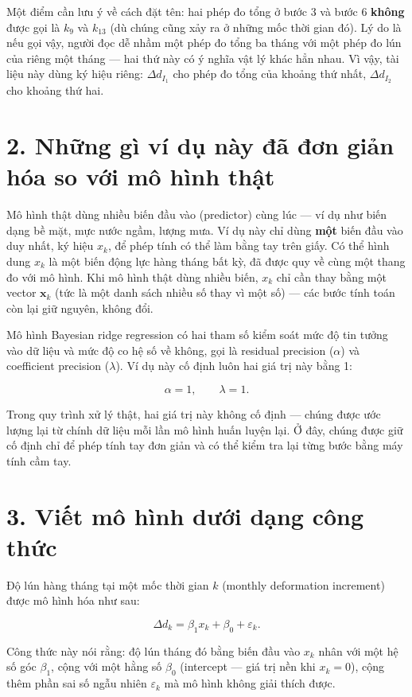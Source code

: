 \documentclass[12pt]{article}
\begin{document}
Một điểm cần lưu ý về cách đặt tên: hai phép đo tổng ở bước 3 và bước 6 \textbf{không} được gọi là $k_9$ và $k_{13}$ (dù chúng cũng xảy ra ở những mốc thời gian đó). Lý do là nếu gọi vậy, người đọc dễ nhầm một phép đo tổng ba tháng với một phép đo lún của riêng một tháng — hai thứ này có ý nghĩa vật lý khác hẳn nhau. Vì vậy, tài liệu này dùng ký hiệu riêng: $\Delta d_{I_1}$ cho phép đo tổng của khoảng thứ nhất, $\Delta d_{I_2}$ cho khoảng thứ hai.

\section{2. Những gì ví dụ này đã đơn giản hóa so với mô hình thật}

Mô hình thật dùng nhiều biến đầu vào (predictor) cùng lúc — ví dụ như biến dạng bề mặt, mực nước ngầm, lượng mưa. Ví dụ này chỉ dùng \textbf{một} biến đầu vào duy nhất, ký hiệu $x_k$, để phép tính có thể làm bằng tay trên giấy. Có thể hình dung $x_k$ là một biến động lực hàng tháng bất kỳ, đã được quy về cùng một thang đo với mô hình. Khi mô hình thật dùng nhiều biến, $x_k$ chỉ cần thay bằng một vector $\boldsymbol{x}_k$ (tức là một danh sách nhiều số thay vì một số) — các bước tính toán còn lại giữ nguyên, không đổi.

Mô hình Bayesian ridge regression có hai tham số kiểm soát mức độ tin tưởng vào dữ liệu và mức độ co hệ số về không, gọi là residual precision ($\alpha$) và coefficient precision ($\lambda$). Ví dụ này cố định luôn hai giá trị này bằng 1:

\[
\alpha=1,
\qquad
\lambda=1.
\]

Trong quy trình xử lý thật, hai giá trị này không cố định — chúng được ước lượng lại từ chính dữ liệu mỗi lần mô hình huấn luyện lại. Ở đây, chúng được giữ cố định chỉ để phép tính tay đơn giản và có thể kiểm tra lại từng bước bằng máy tính cầm tay.

\section{3. Viết mô hình dưới dạng công thức}

Độ lún hàng tháng tại một mốc thời gian $k$ (monthly deformation increment) được mô hình hóa như sau:

\[
\Delta d_k
=
\beta_1x_k+
\beta_0+
\varepsilon_k.
\]

Công thức này nói rằng: độ lún tháng đó bằng biến đầu vào $x_k$ nhân với một hệ số góc $\beta_1$, cộng với một hằng số $\beta_0$ (intercept — giá trị nền khi $x_k=0$), cộng thêm phần sai số ngẫu nhiên $\varepsilon_k$ mà mô hình không giải thích được.
\end{document}
